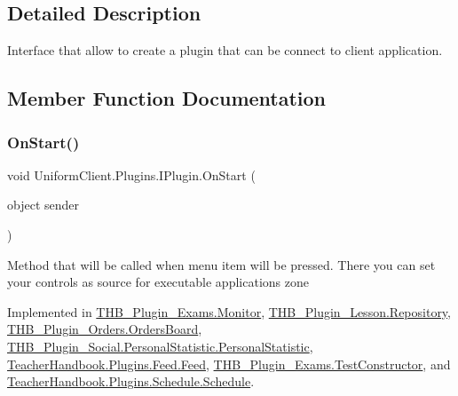 \subsection{Detailed Description}
Interface that allow to create a plugin that can be connect to client application. 



\subsection{Member Function Documentation}
\mbox{\label{interface_uniform_client_1_1_plugins_1_1_i_plugin_a1ca2220c7ce4a23f8f41af10efccf328}} 
\subsubsection{\texorpdfstring{On\+Start()}{OnStart()}}
{\footnotesize\ttfamily void Uniform\+Client.\+Plugins.\+I\+Plugin.\+On\+Start (\begin{DoxyParamCaption}\item[{object}]{sender }\end{DoxyParamCaption})}



Method that will be called when menu item will be pressed. There you can set your controls as source for executable application\textquotesingle{}s zone 



Implemented in \mbox{\hyperlink{class_t_h_b___plugin___exams_1_1_monitor_a57a29bc70438a8b6a186d34c37aea791}{T\+H\+B\+\_\+\+Plugin\+\_\+\+Exams.\+Monitor}}, \mbox{\hyperlink{class_t_h_b___plugin___lesson_1_1_repository_aaf5e62410e0a3df767020f4113d0f51c}{T\+H\+B\+\_\+\+Plugin\+\_\+\+Lesson.\+Repository}}, \mbox{\hyperlink{class_t_h_b___plugin___orders_1_1_orders_board_a3e8397e5999faf2ed2850a8a7d485699}{T\+H\+B\+\_\+\+Plugin\+\_\+\+Orders.\+Orders\+Board}}, \mbox{\hyperlink{class_t_h_b___plugin___social_1_1_personal_statistic_1_1_personal_statistic_aa00014213f73519580b0d37f9dd5f845}{T\+H\+B\+\_\+\+Plugin\+\_\+\+Social.\+Personal\+Statistic.\+Personal\+Statistic}}, \mbox{\hyperlink{class_teacher_handbook_1_1_plugins_1_1_feed_1_1_feed_a70afd18136a6dc16b5edec667a02e6c6}{Teacher\+Handbook.\+Plugins.\+Feed.\+Feed}}, \mbox{\hyperlink{class_t_h_b___plugin___exams_1_1_test_constructor_a63e4366632dc3a521527366b5c28dffc}{T\+H\+B\+\_\+\+Plugin\+\_\+\+Exams.\+Test\+Constructor}}, and \mbox{\hyperlink{class_teacher_handbook_1_1_plugins_1_1_schedule_1_1_schedule_a8f74818aad2b85eea41959b41e4572bd}{Teacher\+Handbook.\+Plugins.\+Schedule.\+Schedule}}.



